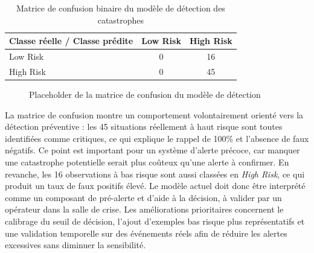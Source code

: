 \begin{table}[H]
\centering
\small
\begin{tabular}{|l|c|c|}
\hline
\textbf{Classe r\'eelle / Classe pr\'edite} & \textbf{Low Risk} & \textbf{High Risk} \\
\hline
Low Risk & 0 & 16 \\
\hline
High Risk & 0 & 45 \\
\hline
\end{tabular}
\caption{Matrice de confusion binaire du mod\`ele de d\'etection des catastrophes}
\label{tab:confusion_matrix_disaster}
\end{table}

\begin{figure}[H]
    \centering
    \caption{Placeholder de la matrice de confusion du mod\`ele de d\'etection}
    \label{fig:confusion_matrix_disaster}
\end{figure}

La matrice de confusion montre un comportement volontairement orient\'e vers la d\'etection pr\'eventive : les 45 situations r\'eellement \`a haut risque sont toutes identifi\'ees comme critiques, ce qui explique le rappel de 100\% et l'absence de faux n\'egatifs. Ce point est important pour un syst\`eme d'alerte pr\'ecoce, car manquer une catastrophe potentielle serait plus co\^uteux qu'une alerte \`a confirmer. En revanche, les 16 observations \`a bas risque sont aussi class\'ees en \textit{High Risk}, ce qui produit un taux de faux positifs \'elev\'e. Le mod\`ele actuel doit donc \^etre interpr\'et\'e comme un composant de pr\'e-alerte et d'aide \`a la d\'ecision, \`a valider par un op\'erateur dans la salle de crise. Les am\'eliorations prioritaires concernent le calibrage du seuil de d\'ecision, l'ajout d'exemples bas risque plus repr\'esentatifs et une validation temporelle sur des \'ev\'enements r\'eels afin de r\'eduire les alertes excessives sans diminuer la sensibilit\'e.

